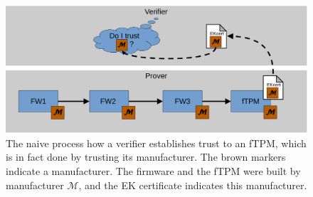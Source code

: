 \begin{figure}[htpb]
  \centering
  \includegraphics[width=1\linewidth]{figures/current_state.pdf}
  \caption{The naive process how a verifier establishes trust to an \ac{fTPM}, which is in fact done by trusting its manufacturer. The brown markers indicate a manufacturer. The firmware and the fTPM were built by manufacturer \(\mathcal{M}\), and the EK certificate indicates this manufacturer.}\label{fig:current_state}
\end{figure}
